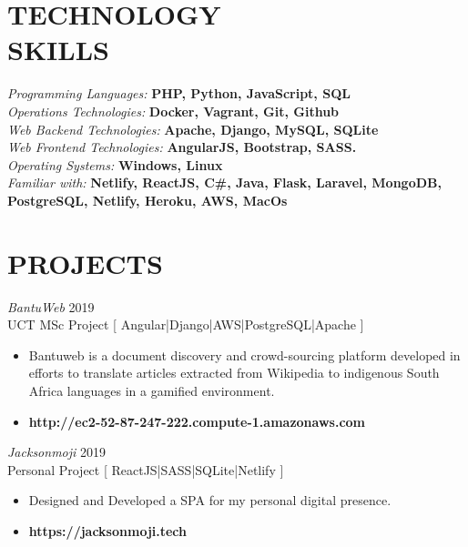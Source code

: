 \documentclass[margin, 10pt]{res}
\begin{document}
\begin{resume}


\section{TECHNOLOGY \\ SKILLS} 

{\sl Programming Languages:} \textbf{PHP, Python, JavaScript, SQL} \\
{\sl Operations Technologies:}\textbf{ Docker, Vagrant, Git, Github} \\
{\sl Web Backend Technologies:} \textbf{ Apache, Django, MySQL, SQLite } \\
{\sl Web Frontend Technologies:} \textbf{ AngularJS, Bootstrap, SASS.} \\
{\sl Operating Systems:} \textbf{ Windows, Linux } \\
{\sl Familiar with:} \textbf{Netlify, ReactJS, C\#, Java, Flask, Laravel, MongoDB, PostgreSQL, Netlify, Heroku, AWS, MacOs} \\


\section{PROJECTS}

{\sl BantuWeb} \hfill 2019 \\
UCT MSc Project [ Angular|Django|AWS|PostgreSQL|Apache ]
\begin{itemize} \itemsep -2pt %
\item Bantuweb is a document discovery and crowd-sourcing platform developed in efforts to translate articles extracted from Wikipedia to indigenous South Africa languages in a gamified environment.
\item \textbf{http://ec2-52-87-247-222.compute-1.amazonaws.com}
\end{itemize}

{\sl Jacksonmoji} \hfill 2019 \\
Personal Project [ ReactJS|SASS|SQLite|Netlify ]
\begin{itemize} \itemsep -2pt %
\item Designed and Developed a SPA for my personal digital presence.
\item \textbf{https://jacksonmoji.tech}
\end{itemize}



\end{resume}
\end{document}
